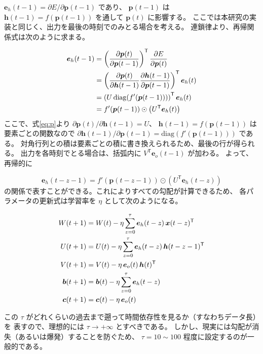 \documentclass[a4paper,11pt,openany]{ltjsreport}
\begin{document}
$\bm{e}_h(t-1) = \partial E / \partial \bm{p}(t-1)$ であり、
$\bm{p}(t-1)$ は $\bm{h}(t-1) = f(\bm{p}(t-1))$ を通して $\bm{p}(t)$ に影響する。
ここでは本研究の実装と同じく、出力を最後の時刻でのみとる場合を考える。
連鎖律より、再帰関係式は次のように求まる。

\begin{align}
  \bm{e}_h(t-1)
   &= \left( \frac{\partial \bm{p}(t)}{\partial \bm{p}(t-1)} \right)^{\mathsf{T}}
      \frac{\partial E}{\partial \bm{p}(t)} \notag\\
   &= \left( \frac{\partial \bm{p}(t)}{\partial \bm{h}(t-1)}
             \frac{\partial \bm{h}(t-1)}{\partial \bm{p}(t-1)} \right)^{\mathsf{T}}
      \bm{e}_h(t) \notag\\
   &= \left( U \,\mathrm{diag}\!\left(f'(\bm{p}(t-1))\right) \right)^{\mathsf{T}} \bm{e}_h(t) \notag\\
   &= f'(\bm{p}(t-1)) \odot \left( U^{\mathsf{T}} \bm{e}_h(t) \right)
   \label{eq:bptt}
\end{align}
ここで、式\eqref{eq:p}より $\partial \bm{p}(t) / \partial \bm{h}(t-1) = U$、
$\bm{h}(t-1) = f(\bm{p}(t-1))$ は要素ごとの関数なので
$\partial \bm{h}(t-1) / \partial \bm{p}(t-1) = \mathrm{diag}(f'(\bm{p}(t-1)))$ である。
対角行列との積は要素ごとの積に書き換えられるため、最後の行が得られる。
出力を各時刻でとる場合は、括弧内に $V^{\mathsf{T}} \bm{e}_o(t-1)$ が加わる。
よって、再帰的に

\begin{equation}
  \bm{e}_h(t-z-1) = f'(\bm{p}(t-z-1)) \odot \left( U^{\mathsf{T}} \bm{e}_h(t-z) \right)
  \label{eq:bptt_z}
\end{equation}
の関係で表すことができる。これによりすべての勾配が計算できるため、
各パラメータの更新式は学習率を $\eta$ として次のようになる。

\begin{align}
  W(t+1) &= W(t) - \eta \sum_{z=0}^{\tau} \bm{e}_h(t-z)\,\bm{x}(t-z)^{\mathsf{T}} \notag\\
  U(t+1) &= U(t) - \eta \sum_{z=0}^{\tau} \bm{e}_h(t-z)\,\bm{h}(t-z-1)^{\mathsf{T}} \notag\\
  V(t+1) &= V(t) - \eta\, \bm{e}_o(t)\,\bm{h}(t)^{\mathsf{T}} \label{eq:update}\\
  \bm{b}(t+1) &= \bm{b}(t) - \eta \sum_{z=0}^{\tau} \bm{e}_h(t-z) \notag\\
  \bm{c}(t+1) &= \bm{c}(t) - \eta\, \bm{e}_o(t) \notag
\end{align}

この $\tau$ がどれくらいの過去まで遡って時間依存性を見るか（すなわちデータ長）を
表すので、理想的には $\tau \to +\infty$ とすべきである。
しかし、現実には勾配が消失（あるいは爆発）することを防ぐため、
$\tau = 10 \sim 100$ 程度に設定するのが一般的である\cite{sugomori2019}。
\end{document}
